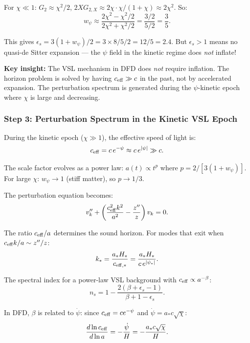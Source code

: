 \documentclass[11pt,a4paper]{article}
\begin{document}
For $\chi \ll 1$: $G_2 \approx \chi^2/2$, $2XG_{2,X} \approx 2\chi \cdot \chi/(1+\chi) \approx 2\chi^2$. So:
\begin{equation}
w_\psi \approx \frac{2\chi^2 - \chi^2/2}{2\chi^2 + \chi^2/2} = \frac{3/2}{5/2} = \frac{3}{5}.
\end{equation}

This gives $\epsilon_s = 3(1+w_\psi)/2 = 3 \times 8/5/2 = 12/5 = 2.4$. But $\epsilon_s > 1$ means no quasi-de Sitter expansion --- the $\psi$ field in the kinetic regime does \emph{not} inflate!

\textbf{Key insight:} The VSL mechanism in DFD does \emph{not} require inflation. The horizon problem is solved by having $c_{\rm eff} \gg c$ in the past, not by accelerated expansion. The perturbation spectrum is generated during the $\psi$-kinetic epoch where $\chi$ is large and decreasing.

\subsubsection{Step 3: Perturbation Spectrum in the Kinetic VSL Epoch}

During the kinetic epoch ($\chi \gg 1$), the effective speed of light is:
\begin{equation}
c_{\rm eff} = c\,e^{-\psi} \approx c\,e^{|\psi|} \gg c.
\end{equation}

The scale factor evolves as a power law: $a(t) \propto t^p$ where $p = 2/[3(1+w_\psi)]$. For large $\chi$: $w_\psi \to 1$ (stiff matter), so $p \to 1/3$.

The perturbation equation becomes:
\begin{equation}
v_k'' + \left(\frac{c_{\rm eff}^2 k^2}{a^2} - \frac{z''}{z}\right)v_k = 0.
\end{equation}

The ratio $c_{\rm eff}/a$ determines the sound horizon. For modes that exit when $c_{\rm eff} k/a \sim z''/z$:
\begin{equation}
k_* = \frac{a_* H_*}{c_{\rm eff,*}} = \frac{a_* H_*}{c\,e^{|\psi_*|}}.
\end{equation}

The spectral index for a power-law VSL background with $c_{\rm eff} \propto a^{-\beta}$:
\begin{equation}
n_s = 1 - \frac{2(\beta + \epsilon_s - 1)}{\beta + 1 - \epsilon_s}.
\end{equation}

In DFD, $\beta$ is related to $\dot\psi$: since $c_{\rm eff} = ce^{-\psi}$ and $\dot\psi = a_* c \sqrt{\chi}$:
\begin{equation}
\frac{d\ln c_{\rm eff}}{d\ln a} = -\frac{\dot\psi}{H} = -\frac{a_* c\sqrt{\chi}}{H}.
\end{equation}
\end{document}
